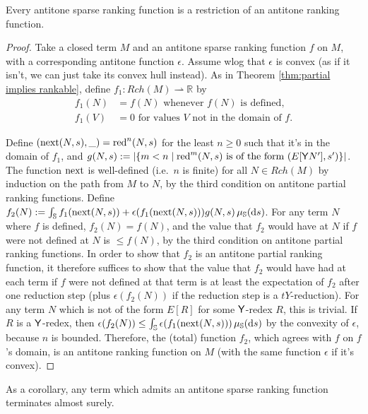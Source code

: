 \begin{theorem}  \label{thm:antitone partial implies rankable}
  Every antitone sparse ranking function is a restriction of an antitone ranking function.
\end{theorem}
\begin{proof}
  Take a closed term $M$ and an antitone sparse ranking function $f$ on $M$, with a corresponding antitone function $\epsilon$. Assume wlog that $\epsilon$ is convex (as if it isn't, we can just take its convex hull instead). As in Theorem \ref{thm:partial implies rankable}, define $f_1 : Rch(M) \rightharpoonup \mathbb R$ by
  \begin{align*}
    f_1(N) &= f(N) \text{ whenever $f(N)$ is defined},\\
    f_1(V) &= 0 \text{ for values $V$ not in the domain of $f$.}
  \end{align*}


  Define $(\operatorname{next}(N,s),\_) = \operatorname{red}^n(N,s)$ for the least $n \geq 0$ such that it's in the domain of $f_1$, and $g(N,s) := \left | \{m < n \mid \operatorname{red}^m(N,s) \text{ is of the form } (E[\mathsf{Y} N'],s') \} \right |$. 
  The function $\operatorname{next}$ is well-defined (i.e.~$n$ is finite) for all $N \in Rch(M)$ by induction on the path from $M$ to $N$, by the third condition on antitone partial ranking functions. Define $f_2(N) := \int_{\mathbb{S}} f_1(\operatorname{next}(N,s)) + \epsilon(f_1(\operatorname{next}(N,s))) g(N,s) \, \mu_{{\mathbb{S}}}(\mathrm d s)$. For any term $N$ where $f$ is defined, $f_2(N) = f(N)$, and the value that $f_2$ would have at $N$ if $f$ were not defined at $N$ is $\leq f(N)$, by the third condition on antitone partial ranking functions. In order to show that $f_2$ is an antitone partial ranking function, it therefore suffices to show that the value that $f_2$ would have had at each term if $f$ were not defined at that term is at least the expectation of $f_2$ after one reduction step (plus $\epsilon(f_2(N))$ if the reduction step is a $tY$-reduction). For any term $N$ which is not of the form $E[R]$ for some $\mathsf{Y}$-redex $R$, this is trivial. If $R$ is a $\mathsf{Y}$-redex, then $\epsilon(f_2(N)) \leq \int_{\mathbb{S}} \epsilon(f_1(\operatorname{next}(N,s)))\, \mu_{{\mathbb{S}}}(\mathrm d s)$ by the convexity of $\epsilon$, because $n$ is bounded. Therefore, the (total) function $f_2$, which agrees with $f$ on $f$'s domain, is an antitone ranking function on $M$ (with the same function $\epsilon$ if it's convex).
\end{proof}

As a corollary, any term which admits an antitone sparse ranking function terminates almost surely.

